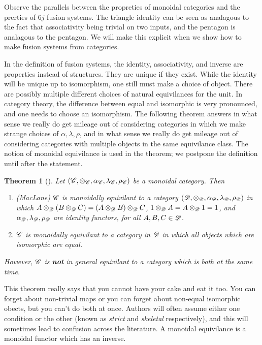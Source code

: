 \documentclass{article}
\newtheorem{theorem}{Theorem}[section]
\theoremstyle{definition}
\numberwithin{figure}{section}
\begin{document}
Observe the parallels between the propreties of monoidal categories and the prerties of $6j$ fusion systems. The triangle identity can be seen as analagous to the fact that associativity being trivial on two inputs, and the pentagon is analagous to the pentagon. We will make this explicit when we show how to make fusion systems from categories.

In the definition of fusion systems, the identity, associativity, and inverse are properties instead of structures. They are unique if they exist. While the identity will be unique up to isomorphism, one still must make a choice of object. There are possibly multiple different choices of natural equivilances for the unit. In category theory, the difference between equal and isomorphic is very pronounced, and one needs to choose an isomorphism. The following theorem answers in what sense we really do get mileage out of considering categories in which we make strange choices of $\alpha,\lambda,\rho$, and in what sense we really do get mileage out of considering categories with multiple objects in the same equivilance class. The notion of monoidal equivilance is used in the theorem; we postpone the definition until after the statement.

\begin{theorem}[\cite{hagge2009some}] Let $(\mathscr{C},\otimes_{\mathscr{C}},\alpha_{\mathscr{C}},\lambda_{\mathscr{C}},\rho_{\mathscr{C}})$ be a monoidal category. Then

\begin{enumerate}
\item (MacLane)  $\mathscr{C}$ is monoidally equivilant to a category $(\mathscr{D},\otimes_{\mathscr{D}},\alpha_{\mathscr{D}},\lambda_{\mathscr{D}},\rho_{\mathscr{D}})$ in which $A\otimes_{\mathscr{D}} (B\otimes_{\mathscr{D}} C)=(A\otimes_{\mathscr{D}} B)\otimes_{\mathscr{D}} C$, $1\otimes_{\mathscr{D}} A=A\otimes_{\mathscr{D}} 1=1$, and $\alpha_{\mathscr{D}},\lambda_{\mathscr{D}},\rho_{\mathscr{D}}$ are identity functors, for all $A,B,C\in \mathscr{D}$. 
\item $\mathscr{C}$ is monoidally equivilant to a category in $\mathscr{D}$ in which all objects which are isomorphic are equal.
\end{enumerate}

However, $\mathscr{C}$ is \textbf{not} in general equivilant to a category which is both at the same time.
\end{theorem}

This theorem really says that you cannot have your cake and eat it too. You can forget about non-trivial maps or you can forget about non-equal isomorphic obects, but you can't do both at once. Authors will often assume either one condition or the other (known as \textit{strict} and \textit{skeletal} respectively), and this will sometimes lead to confusion across the literature. A monoidal equivilance is a monoidal functor which has an inverse.
\end{document}
